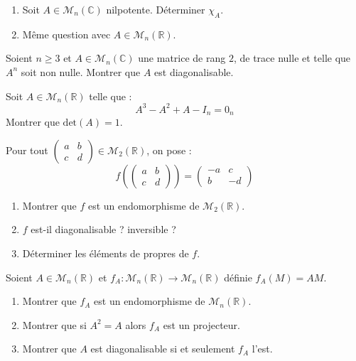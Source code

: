 \documentclass[a4paper,10pt]{report}
\begin{document}
\begin{Exa}
  \begin{enumerate}
  \item  Soit $A \in \mathcal{M}_{n}(\mathbb{C})$ nilpotente. Déterminer $\chi_{A}$.
  \item Même question avec $A \in \mathcal{M}_{n}(\mathbb{R})$.
  \end{enumerate}
\end{Exa} 


\begin{Exa}[\ding{80}] Soient $n \geq 3$ et $A \in \mathcal{M}_{n}(\mathbb{C})$ une matrice de rang $2$, de trace nulle et telle que $A^n$ soit non nulle. Montrer que $A$ est diagonalisable.
\end{Exa}


\begin{Exa}[\ding{80}] Soit $A \in \mathcal{M}_{n}(\mathbb{R})$ telle que :
  \[
  A^{3} - A^{2} + A - I_n = 0_n
  \]
Montrer que $\textrm{det}(A) = 1$.
\end{Exa}


\begin{Exa} Pour tout $\begin{pmatrix}
a & b \\
c & d 
\end{pmatrix} \in \mathcal{M}_2(\mathbb{R})$, on pose :
$$ f \left( \begin{pmatrix}
a & b \\
c & d 
\end{pmatrix} \right) = \begin{pmatrix}
-a & c \\
b & -d 
\end{pmatrix}$$

\begin{enumerate}
\item Montrer que $f$ est un endomorphisme de $\mathcal{M}_2(\mathbb{R})$.
\item $f$ est-il diagonalisable ? inversible ?
\item Déterminer les éléments de propres de $f$.
\end{enumerate}
\end{Exa}



\begin{Exa} Soient $A \in \mathcal{M}_n(\mathbb{R})$ et $f_A : \mathcal{M}_n(\mathbb{R}) \rightarrow \mathcal{M}_n(\mathbb{R})$ définie $f_A(M)=AM$.

\begin{enumerate}
\item Montrer que $f_A$ est un endomorphisme de $\mathcal{M}_n(\mathbb{R})$.
\item Montrer que si $A^2=A$ alors $f_A$ est un projecteur.
\item Montrer que $A$ est diagonalisable si et seulement $f_A$ l'est.
\end{enumerate}
\end{Exa}
\end{document}
